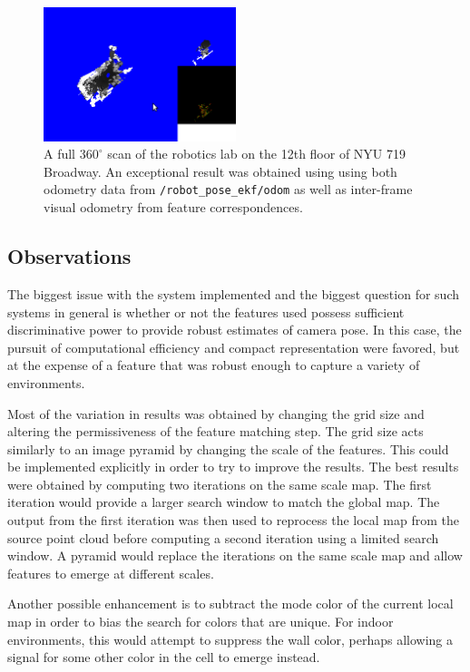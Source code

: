 \documentclass[letterpaper]{article}%
\begin{document}
\begin{figure}
  \centering
  \includegraphics[width=0.5\textwidth]{lab_scans/lab_scan_06.png}
  \caption{A full $360^{\circ}$ scan of the robotics lab on the 12th floor of
  NYU 719 Broadway. An exceptional result was obtained using using both
  odometry data from {\tt /robot\_pose\_ekf/odom} as well as inter-frame visual
  odometry from feature correspondences.}
  \label{fig:lab_scan_exceptional}
\end{figure}

\subsection{Observations}
The biggest issue with the system implemented and the biggest question for such
systems in general is whether or not the features used possess sufficient
discriminative power to provide robust estimates of camera pose. In this case,
the pursuit of computational efficiency and compact representation were
favored, but at the expense of a feature that was robust enough to capture a
variety of environments.

Most of the variation in results was obtained by changing the grid size and
altering the permissiveness of the feature matching step. The grid size acts
similarly to an image pyramid by changing the scale of the features. This could
be implemented explicitly in order to try to improve the results. The best
results were obtained by computing two iterations on the same scale map.  The
first iteration would provide a larger search window to match the global map.
The output from the first iteration was then used to reprocess the local map
from the source point cloud before computing a second iteration using a
limited search window. A pyramid would replace the iterations on the same scale
map and allow features to emerge at different scales.

Another possible enhancement is to subtract the mode color of the current
local map in order to bias the search for colors that are unique. For indoor
environments, this would attempt to suppress the wall color, perhaps allowing a
signal for some other color in the cell to emerge instead.
\end{document}
